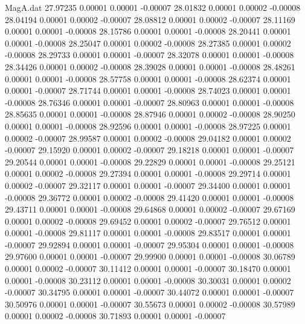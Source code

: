 \begin{filecontents}{MagA.dat}
  27.97235    0.00001    0.00001   -0.00007
  28.01832    0.00001    0.00002   -0.00008
  28.04194    0.00001    0.00002   -0.00007
  28.08812    0.00001    0.00002   -0.00007
  28.11169    0.00001    0.00001   -0.00008
  28.15786    0.00001    0.00001   -0.00008
  28.20441    0.00001    0.00001   -0.00008
  28.25047    0.00001    0.00002   -0.00008
  28.27385    0.00001    0.00002   -0.00008
  28.29733    0.00001    0.00001   -0.00007
  28.32078    0.00001    0.00001   -0.00008
  28.34426    0.00001    0.00002   -0.00008
  28.39028    0.00001    0.00001   -0.00008
  28.48261    0.00001    0.00001   -0.00008
  28.57758    0.00001    0.00001   -0.00008
  28.62374    0.00001    0.00001   -0.00007
  28.71744    0.00001    0.00001   -0.00008
  28.74023    0.00001    0.00001   -0.00008
  28.76346    0.00001    0.00001   -0.00007
  28.80963    0.00001    0.00001   -0.00008
  28.85635    0.00001    0.00001   -0.00008
  28.87946    0.00001    0.00002   -0.00008
  28.90250    0.00001    0.00001   -0.00008
  28.92596    0.00001    0.00001   -0.00008
  28.97225    0.00001    0.00002   -0.00007
  28.99587    0.00001    0.00002   -0.00008
  29.04182    0.00001    0.00002   -0.00007
  29.15920    0.00001    0.00002   -0.00007
  29.18218    0.00001    0.00001   -0.00007
  29.20544    0.00001    0.00001   -0.00008
  29.22829    0.00001    0.00001   -0.00008
  29.25121    0.00001    0.00002   -0.00008
  29.27394    0.00001    0.00001   -0.00008
  29.29714    0.00001    0.00002   -0.00007
  29.32117    0.00001    0.00001   -0.00007
  29.34400    0.00001    0.00001   -0.00008
  29.36772    0.00001    0.00002   -0.00008
  29.41420    0.00001    0.00001   -0.00008
  29.43711    0.00001    0.00001   -0.00008
  29.64868    0.00001    0.00002   -0.00007
  29.67169    0.00001    0.00002   -0.00008
  29.69452    0.00001    0.00002   -0.00007
  29.76512    0.00001    0.00001   -0.00008
  29.81117    0.00001    0.00001   -0.00008
  29.83517    0.00001    0.00001   -0.00007
  29.92894    0.00001    0.00001   -0.00007
  29.95304    0.00001    0.00001   -0.00008
  29.97600    0.00001    0.00001   -0.00007
  29.99900    0.00001    0.00001   -0.00008
  30.06789    0.00001    0.00002   -0.00007
  30.11412    0.00001    0.00001   -0.00007
  30.18470    0.00001    0.00001   -0.00008
  30.23112    0.00001    0.00001   -0.00008
  30.30031    0.00001    0.00002   -0.00007
  30.34795    0.00001    0.00001   -0.00007
  30.44072    0.00001    0.00001   -0.00007
  30.50976    0.00001    0.00001   -0.00007
  30.55673    0.00001    0.00002   -0.00008
  30.57989    0.00001    0.00002   -0.00008
  30.71893    0.00001    0.00001   -0.00007

\end{filecontents}
